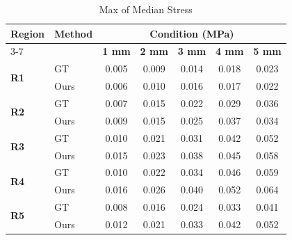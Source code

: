 \documentclass{article}
\begin{document}
\thispagestyle{empty}

\begin{table}[h]
\centering
\caption{Max of Median Stress}
\vspace{0.3cm}
\begin{tabular}{llccccc}
\toprule
\textbf{Region} & \textbf{Method} & \multicolumn{5}{c}{\textbf{Condition (MPa)}} \\
\cmidrule(lr){3-7}
& & \textbf{1 mm} & \textbf{2 mm} & \textbf{3 mm} & \textbf{4 mm} & \textbf{5 mm} \\
\midrule
\multirow{2}{*}{\textbf{R1}} & GT  & 0.005 & 0.009 & 0.014 & 0.018 & 0.023 \\
 & Ours  & 0.006 & 0.010 & 0.016 & 0.017 & 0.022 \\ \midrule
\multirow{2}{*}{\textbf{R2}} & GT  & 0.007 & 0.015 & 0.022 & 0.029 & 0.036 \\
 & Ours  & 0.009 & 0.015 & 0.025 & 0.037 & 0.034 \\ \midrule
\multirow{2}{*}{\textbf{R3}} & GT  & 0.010 & 0.021 & 0.031 & 0.042 & 0.052 \\
 & Ours  & 0.015 & 0.023 & 0.038 & 0.045 & 0.058 \\ \midrule
\multirow{2}{*}{\textbf{R4}} & GT  & 0.010 & 0.022 & 0.034 & 0.046 & 0.059 \\
 & Ours  & 0.016 & 0.026 & 0.040 & 0.052 & 0.064 \\ \midrule
\multirow{2}{*}{\textbf{R5}} & GT  & 0.008 & 0.016 & 0.024 & 0.033 & 0.041 \\
 & Ours  & 0.012 & 0.021 & 0.033 & 0.042 & 0.052 \\
\bottomrule
\end{tabular}
\end{table}
\end{document}
